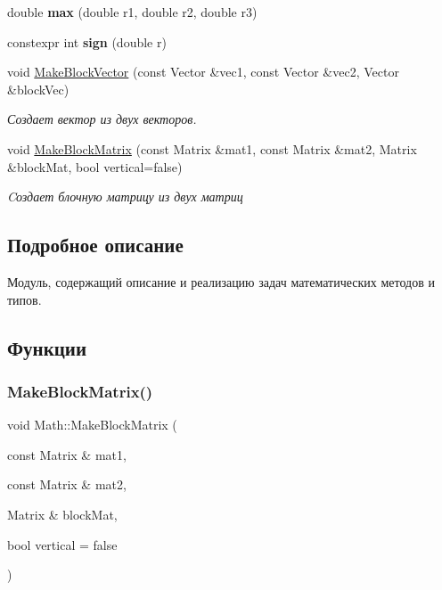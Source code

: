 \begin{DoxyCompactItemize}
double {\bfseries max} (double r1, double r2, double r3)
\item 
\hypertarget{namespace_math_a4650857e985bad2d24c465ca82636ed9}{}\label{namespace_math_a4650857e985bad2d24c465ca82636ed9} 
constexpr int {\bfseries sign} (double r)
\item 
void \hyperlink{namespace_math_a0b4a2119a9abdbfe7902e57a22e6405e}{Make\+Block\+Vector} (const Vector \&vec1, const Vector \&vec2, Vector \&block\+Vec)
\begin{DoxyCompactList}\small\item\em Создает вектор из двух векторов. \end{DoxyCompactList}\item 
void \hyperlink{namespace_math_ae35cd48733558c989154be3201e754ab}{Make\+Block\+Matrix} (const Matrix \&mat1, const Matrix \&mat2, Matrix \&block\+Mat, bool vertical=false)
\begin{DoxyCompactList}\small\item\em Cоздает блочную матрицу из двух матриц \end{DoxyCompactList}\end{DoxyCompactItemize}


\subsection{Подробное описание}
Модуль, содержащий описание и реализацию задач математических методов и типов. 

\subsection{Функции}
\hypertarget{namespace_math_ae35cd48733558c989154be3201e754ab}{}\label{namespace_math_ae35cd48733558c989154be3201e754ab} 
\subsubsection{\texorpdfstring{Make\+Block\+Matrix()}{MakeBlockMatrix()}}
{\footnotesize\ttfamily void Math\+::\+Make\+Block\+Matrix (\begin{DoxyParamCaption}\item[{const Matrix \&}]{mat1,  }\item[{const Matrix \&}]{mat2,  }\item[{Matrix \&}]{block\+Mat,  }\item[{bool}]{vertical = {\ttfamily false} }\end{DoxyParamCaption})}



